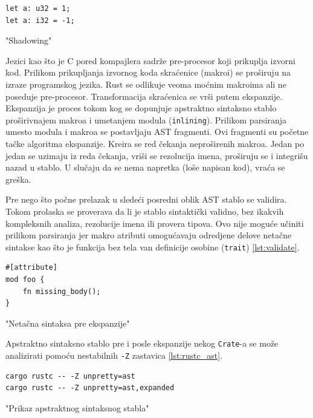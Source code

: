 \documentclass[11pt]{article}
\begin{document}
\begin{listing}[H]
\begin{verbatim}
let a: u32 = 1;
let a: i32 = -1;
\end{verbatim}
\caption{"Shadowing"}
\label{lst:shadowing}
\end{listing}
\newpage

Jezici kao što je C pored kompajlera sadrže pre-procesor koji prikuplja izvorni kod. 
Prilikom prikupljanja izvornog koda skraćenice (makroi) se proširuju na izraze programskog jezika. 
Rust se odlikuje veoma moćnim makroima ali ne poseduje pre-procesor. Transformacija skraćenica se vrši 
putem ekspanzije.  Ekspanzija je proces tokom kog se dopunjuje apstraktno sintaksno stablo
proširivnajem makroa i umetanjem modula (\verb|inlining|). Prilikom parsiranja umesto 
modula i makroa se postavljaju AST fragmenti. Ovi fragmenti su početne tačke algoritma ekspanzije.
Kreira se red čekanja neproširenih makroa. Jedan po jedan se uzimaju iz reda čekanja, vriši se rezolucija imena,
proširuju se i integrišu nazad u stablo. U slučaju da se nema napretka (loše napisan kod), vraća se greška.

Pre nego što počne prelazak u sledeći posredni oblik AST stablo se validira. 
Tokom prolaska se proverava da li je stablo sintaktički validno, bez ikakvih kompleksnih analiza,
rezolucije imena ili provera tipova. Ovo nije moguće učiniti prilikom parsiranja jer makro atributi 
omogućavaju odredjene delove netačne sintakse kao što je funkcija bez tela van definicije osobine (\verb|trait|) \ref{lst:validate}.

\begin{listing}[H]
\begin{verbatim}
#[attribute]
mod foo {
    fn missing_body();
}
\end{verbatim}
\caption{"Netačna sintaksa pre ekspanzije"}
\label{lst:validate}
\end{listing}

Apstraktno sintaksno stablo pre i posle ekspanzije nekog \verb|Crate|-a se može analizirati pomoću 
nestabilnih \verb|-Z| zastavica \ref{lst:rustc_ast}.


\begin{listing}[H]
\begin{verbatim}
cargo rustc -- -Z unpretty=ast
cargo rustc -- -Z unpretty=ast,expanded
\end{verbatim}
\caption{"Prikaz apstraktnog sintaksnog stabla"}
\label{lst:rustc_ast}
\end{listing}
\end{document}

